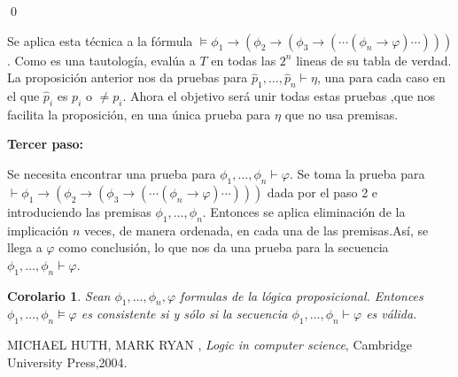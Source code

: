 \documentclass[18pt]{article}
\newtheorem{Cor}{Corolario}
\begin{document}
\qed

Se aplica esta técnica a la fórmula $\models \phi_1 \rightarrow ( \phi_2 \rightarrow ( \phi_3 \rightarrow ( \cdots (\phi_n \rightarrow \varphi )\cdots )))$. Como es una tautología, evalúa a $T$ en todas las $2^n$ lineas de su tabla de verdad. La proposición anterior nos da pruebas para $\hat{p}_1,\dots, \hat{p}_n \vdash \eta$, una para cada caso en el que $\hat{p}_i $ es $p_i$ o $\neq p_i$. Ahora el objetivo será unir todas estas pruebas ,que nos facilita la proposición, en una única prueba para $\eta$ que no usa premisas. 


\vspace{2mm}
\textbf{Tercer paso:}

Se necesita encontrar una prueba para $\phi_1,\dots, \phi_n \vdash \varphi$. Se toma la prueba para $\vdash \phi_1 \rightarrow ( \phi_2 \rightarrow (\phi_3 \rightarrow ( \cdots (\phi_n \rightarrow \varphi ) \cdots )))$ dada por el paso 2 e introduciendo las premisas $\phi_1,\dots, \phi_n$. Entonces se aplica eliminación de la implicación $n$ veces, de manera ordenada, en cada una de  las premisas.Así, se llega a  $\varphi$ como conclusión, lo que nos da una prueba para la secuencia $\phi_1,\dots, \phi_n \vdash \varphi$. 

\begin{Cor}
Sean $\phi_1,\dots , \phi_n,\varphi$ formulas de la lógica
proposicional. Entonces $\phi_1,\dots, \phi_n \models \varphi$ es consistente
si y sólo si la secuencia $\phi_1,\dots, \phi_n \vdash \varphi$ es válida. 
\end{Cor}


\begin{thebibliography}{X}
 \textsc{MICHAEL HUTH, MARK RYAN} ,
\textit{Logic in computer science}, Cambridge University Press,2004.
\end{thebibliography}
\end{document}
